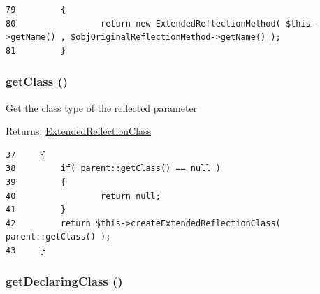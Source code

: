 \begin{Code}\begin{verbatim}79         {
80                 return new ExtendedReflectionMethod( $this->getName() , $objOriginalReflectionMethod->getName() );
81         }
\end{verbatim}
\end{Code}


\hypertarget{class_extended_reflection_parameter_23ecbde357f7f6bde5a50f876334a74d}{
\subsubsection[{getClass}]{\setlength{\rightskip}{0pt plus 5cm}getClass ()}}
\label{class_extended_reflection_parameter_23ecbde357f7f6bde5a50f876334a74d}


Get the class type of the reflected parameter

\begin{Desc}
\item[Returns:]\hyperlink{class_extended_reflection_class}{ExtendedReflectionClass} \end{Desc}


\begin{Code}\begin{verbatim}37     {
38         if( parent::getClass() == null )
39         {
40                 return null;
41         }
42         return $this->createExtendedReflectionClass( parent::getClass() );
43     }
\end{verbatim}
\end{Code}


\hypertarget{class_extended_reflection_parameter_acff3f8d93cc250281f0f73bff3422e1}{
\subsubsection[{getDeclaringClass}]{\setlength{\rightskip}{0pt plus 5cm}getDeclaringClass ()}}
\label{class_extended_reflection_parameter_acff3f8d93cc250281f0f73bff3422e1}


